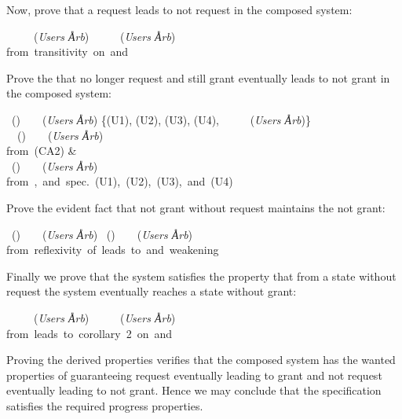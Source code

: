 Now, prove that a request leads to not request in the composed system:
\begin{thm} 
\mforall\ \rqi\ \leadto\ \mnot\rqi\ \mmin\ ({\it Users \U Arb})\nb[head4]
\p
\mforall\ \rqi\ \leadto\ \mnot\rqi\ \mmin\ ({\it Users \U Arb})\nb[p41]\\
 \cnnn \mbox{from transitivity on  and }
\end{thm}

Prove the that no longer request and still grant eventually leads to not grant 
in the composed system:
\begin{thm} 
\mforall\ (\mnot\rqi\;\mand\;\gri)\ \leadto\
              \mnot\gri\ \mmin\ ({\it Users \U Arb})\nb[head5]
\p
\{(U1), (U2), (U3), (U4),
 \mforall\ \gri\ \leadto\ \mnot\rqi\ \mmin\ ({\it Users \U Arb})\}\\
   \cnn \mturn\
     \mforall\ (\mnot\rqi\;\mand\;\gri)\ \leadto\
                 \mnot\gri\ \mmin\ ({\it Users \U Arb})\nb[p51]\\
 \cnnn  \mbox{from (CA2)}                  &\\
\mforall\ (\mnot\rqi\;\mand\;\gri)\ \leadto\
               \mnot\gri\ \mmin\ ({\it Users \U Arb})\nb[p52]\\
 \cnnn \mbox{from \tref{head1}, and spec. (U1), (U2), (U3), and (U4)}
\end{thm}

Prove the evident fact that not grant without request maintains the not
grant:
\begin{thm} 
\mforall\ (\mnot\rqi\;\mand\;\mnot\gri)\ \leadto\
              \mnot\gri\ \mmin\ ({\it Users \U Arb})\nb[head6]
\p
\mforall\ (\mnot\rqi\;\mand\;\mnot\gri)\ \leadto\
               \mnot\gri\ \mmin\ ({\it Users \U Arb})\nb[p61]\\
 \cnnn \mbox{from reflexivity of leads to and weakening}
\end{thm}

Finally we prove that the system satisfies the property that from a state
without request the system eventually reaches a state without grant:
\begin{thm}
\mforall\ \mnot\rqi\ \leadto\ \mnot\gri\ \mmin\ ({\it Users \U Arb})\nb[head7]
\p
\mforall\ \mnot\rqi\ \leadto\ \mnot\gri\ \mmin\ ({\it Users \U Arb})\nb[p71]\\
 \cnnn \mbox{from leads to corollary 2 on \tref{head5} and \tref{head6}}
\end{thm}

Proving the derived properties verifies that the composed system has the wanted 
properties of guaranteeing request eventually leading to grant and not request 
eventually leading to not grant.  Hence we may conclude that the specification
satisfies the required progress properties.

